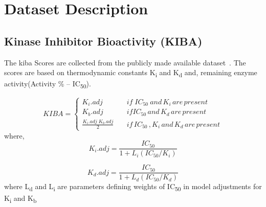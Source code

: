 \section{Dataset Description}

\subsection{Kinase Inhibitor Bioactivity (KIBA)} \label{section:kiba}
The \acrfull{kiba} Scores are collected from the publicly made available dataset~\citep{Tang2013}. The scores are based on thermodynamic constants K\textsubscript{i} and K\textsubscript{d} and, remaining enzyme activity(Activity \% --  IC\textsubscript{50}).

\begin{equation}
  KIBA = \begin{cases}
    K_i . {adj} & \quad {if} \; {IC_{50}\: and\, K_i \,are\, present} \\
    K_b.{adj} & \quad {if}  {IC_{50} \, and \, K_d \, are \, present} \\
    \frac{K_i . {adj} \; K_b.{adj}}{2} & \quad {if\, IC_{50}\,,K_i\, and \,K_d\, are\, present}
  \end{cases}
   \label{eq:kiba}
\end{equation}
where,
\begin{equation}
K_i.{adj} = \frac{IC_{50}}{1 + L_i(IC_{50}/K_i)}
\label{eq:ki_adj}
\end{equation}

\begin{equation}
K_d.{adj} = \frac{IC_{50}}{1 + L_d(IC_{50}/K_d)}
\end{equation}
where L\textsubscript{d} and L\textsubscript{i} are parameters defining weights of IC\textsubscript{50} in model adjustments for K\textsubscript{i} and K\textsubscript{b} 

